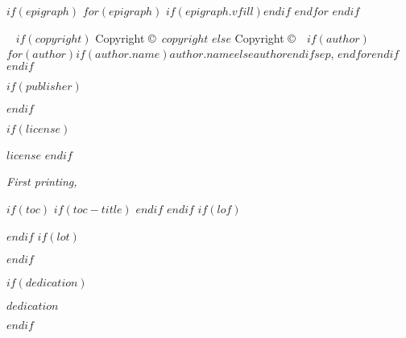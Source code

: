 \frontmatter

\blankpage

$if(epigraph)$
\newpage\thispagestyle{empty}
$for(epigraph)$
$if(epigraph.vfill)$\vfill$endif$
$endfor$
$endif$

\maketitle

\newpage
\begin{fullwidth}
~\vfill
\thispagestyle{empty}
\setlength{\parindent}{0pt}
\setlength{\parskip}{\baselineskip}
$if(copyright)$
Copyright \copyright\ $copyright$
$else$
Copyright \copyright\ \the\year\ $if(author)$$for(author)$$if(author.name)$$author.name$$else$$author$$endif$$sep$, $endfor$$endif$
$endif$

$if(publisher)$
\par{}
$endif$

$if(license)$
\par $license$
$endif$

\par\textit{First printing, \monthyear}
\end{fullwidth}

$if(toc)$
{
$if(toc-title)$
\renewcommand*\contentsname{$toc-title$}
$endif$
\tableofcontents
}
$endif$
$if(lof)$
\listoffigures
$endif$
$if(lot)$
\listoftables
$endif$

$if(dedication)$
\cleardoublepage
~\vfill
\begin{doublespace}
\noindent\fontsize{18}{22}\selectfont\itshape
\nohyphenation
$dedication$
\end{doublespace}
\vfill
\vfill
$endif$

\mainmatter